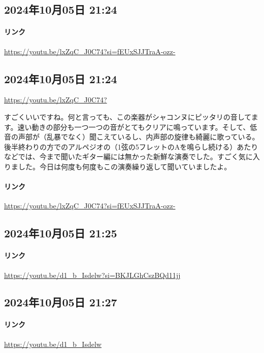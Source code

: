 \subsection*{2024年10月05日 21:24}

\paragraph{リンク}
\url{https://youtu.be/lxZqC_J0C74?si=fEUxSJJTraA-ozz-}

\subsection*{2024年10月05日 21:24}

\url{https://youtu.be/lxZqC_J0C74?}

すごくいいですね。何と言っても、この楽器がシャコンヌにピッタリの音してます。速い動きの部分も一つ一つの音がとてもクリアに鳴っています。そして、低音の声部が（乱暴でなく）聞こえているし、内声部の旋律も綺麗に歌っている。後半終わりの方でのアルペジオの（1弦の5フレットのAを鳴らし続ける）あたりなどでは、今まで聞いたギター編には無かった新鮮な演奏でした。すごく気に入りました。今日は何度も何度もこの演奏繰り返して聞いていましたよ。

\paragraph{リンク}
\url{https://youtu.be/lxZqC_J0C74?si=fEUxSJJTraA-ozz-}

\subsection*{2024年10月05日 21:25}

\paragraph{リンク}
\url{https://youtu.be/d1_b_Isdelw?si=BKJLGhCszBQd11jj}

\subsection*{2024年10月05日 21:27}

\paragraph{リンク}
\url{https://youtu.be/d1_b_Isdelw}

